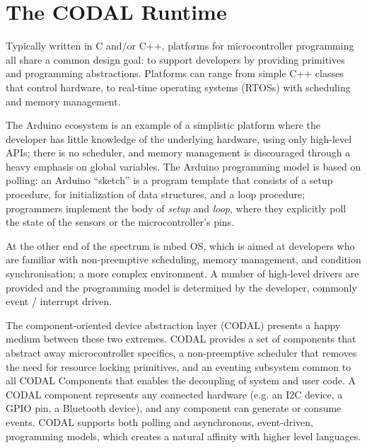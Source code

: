 \section{The CODAL Runtime}
\label{sec:codal}



Typically written in C and/or C++, platforms for microcontroller programming all share a common design goal: to support developers by providing primitives and programming abstractions. Platforms can range from simple C++ classes that control hardware, to real-time operating systems (RTOSs) with scheduling and memory management.

The Arduino ecosystem is an example of a simplistic platform where the developer has little knowledge of the underlying hardware, using only high-level APIs; there is no scheduler, and memory management is discouraged through a heavy emphasis on global variables.  The Arduino programming model is based on polling: an Arduino ``sketch'' is a program template that consists of a setup procedure, for initialization of data structures, and a loop procedure; programmers implement the body of \textit{setup} and \textit{loop}, where they explicitly poll the state of the sensors or the microcontroller's pins.

At the other end of the spectrum is mbed OS, which is aimed at developers who are familiar with non-preemptive scheduling, memory management, and condition synchronisation; a more complex environment. A number of high-level drivers are provided and the programming model is determined by the developer, commonly event / interrupt driven.

The component-oriented device abstraction layer (CODAL) presents a happy medium between these two extremes. CODAL provides a set of components that abstract away microcontroller specifics, a non-preemptive scheduler that removes the need for resource locking primitives, and an eventing subsystem common to all CODAL Components that enables the decoupling of system and user code. A CODAL component represents any connected hardware (e.g. an I2C device, a GPIO pin, a Bluetooth device), and any component can generate or consume events. CODAL supports both polling and asynchronous, event-driven, programming models, which creates a natural affinity with higher level languages.

